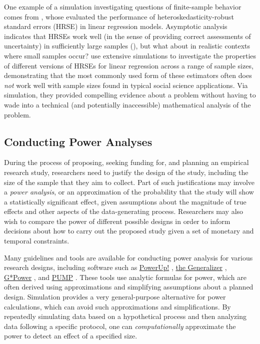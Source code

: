 \documentclass[
]{book}
\begin{document}
One example of a simulation investigating questions of finite-sample behavior comes from \citet{longUsingHeteroscedasticityConsistent2000}, whose evaluated the performance of heteroskedasticity-robust standard errors (HRSE) in linear regression models.
Asymptotic analysis indicates that HRSEs work well (in the sense of providing correct assessments of uncertainty) in sufficiently large samples (\citet{White1980heteroskedasticity}), but what about in realistic contexts where small samples occur?
\citet{longUsingHeteroscedasticityConsistent2000} use extensive simulations to investigate the properties of different versions of HRSEs for linear regression across a range of sample sizes, demonstrating that the most commonly used form of these estimators often does \emph{not} work well with sample sizes found in typical social science applications.
Via simulation, they provided compelling evidence about a problem without having to wade into a technical (and potentially inaccessible) mathematical analysis of the problem.

\subsection{Conducting Power Analyses}\label{conducting-power-analyses}

During the process of proposing, seeking funding for, and planning an empirical research study, researchers need to justify the design of the study, including the size of the sample that they aim to collect.
Part of such justifications may involve a \emph{power analysis}, or an approximation of the probability that the study will show a statistically significant effect, given assumptions about the magnitude of true effects and other aspects of the data-generating process.
Researchers may also wish to compare the power of different possible designs in order to inform decisions about how to carry out the proposed study given a set of monetary and temporal constraints.

Many guidelines and tools are available for conducting power analysis for various research designs, including software such as \href{https://www.causalevaluation.org/power-analysis.html}{PowerUp!} \citep{dong2013PowerUpToolCalculating}, \href{https://www.thegeneralizer.org/}{the Generalizer} \citep{tipton2014stratified}, \href{https://www.psychologie.hhu.de/arbeitsgruppen/allgemeine-psychologie-und-arbeitspsychologie/gpower}{G*Power} \citep{faul2009StatisticalPowerAnalyses}, and \href{https://cran.r-project.org/web//packages/PUMP/index.html}{PUMP} \citep{hunter2023PowerMultiplicityProject}.
These tools use analytic formulas for power, which are often derived using approximations and simplifying assumptions about a planned design. Simulation provides a very general-purpose alternative for power calculations, which can avoid such approximations and simplifications.
By repeatedly simulating data based on a hypothetical process and then analyzing data following a specific protocol, one can \emph{computationally} approximate the power to detect an effect of a specified size.
\end{document}
